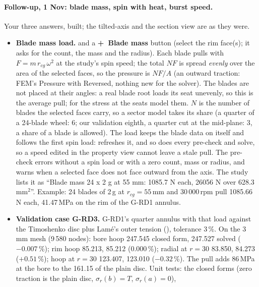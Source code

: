 \paragraph{Follow-up, 1 Nov: blade mass, spin with heat, burst speed.}
Your three answers, built; the tilted-axis  and the section view are as they were.
\begin{itemize}[nosep]
  \item \textbf{Blade mass load.}  and a \textbf{+~Blade
        mass} button (select the rim face(s); it asks for the count, the mass and the radius). Each blade pulls with
        $F=m\,r_{cg}\,\omega^2$ at the study's spin speed; the total $N F$ is spread \emph{evenly} over the area of the
        selected faces, so the pressure is $N F/A$ (an outward traction: FEM's Pressure with Reversed, nothing new for the
        solver). The blades are not placed at their angles: a real blade root loads its seat unevenly, so this is the
        average pull; for the stress at the seats model them. $N$ is the number of blades the selected faces carry, so a
        sector model takes its share (a quarter of a 24-blade wheel: 6; our validation eighth, a quarter cut at the
        mid-plane: 3, a share of a blade is allowed). The load keeps the blade data on itself and follows the first spin
        load:  refreshes it, and so does every pre-check and solve, so a speed edited in the property
        view cannot leave a stale pull. The pre-check errors without a spin load or with a zero count, mass or radius, and
        warns when a selected face does not face outward from the axis. The study lists it as ``Blade mass 24 x 2 g at
        55 mm: 1085.7 N each, 26056 N over 628.3 mm$^2$''. Example: 24 blades of 2\,g at $r_{cg}=55$\,mm and 30\,000\,rpm
        pull 1085.66\,N each, 41.47\,MPa on the rim of the G-RD1 annulus.
  \item \textbf{Validation case G-RD3.} G-RD1's quarter annulus with that load against the Timoshenko disc plus Lam\'e's
        outer tension (), tolerance 3\,\%. On the 3\,mm mesh (9\,580 nodes): bore hoop
        247.545 closed form, 247.527 solved ($-0.007$\,\%); rim hoop 85.213, 85.212 ($0.000$\,\%); radial at $r=30$ 83.850,
        84.273 ($+0.51$\,\%); hoop at $r=30$ 123.407, 123.010 ($-0.32$\,\%). The pull adds 86\,MPa at the bore to the 161.15
        of the plain disc. Unit tests: the closed forms (zero traction is the plain disc, $\sigma_r(b)=T$, $\sigma_r(a)=0$),

\end{itemize}
